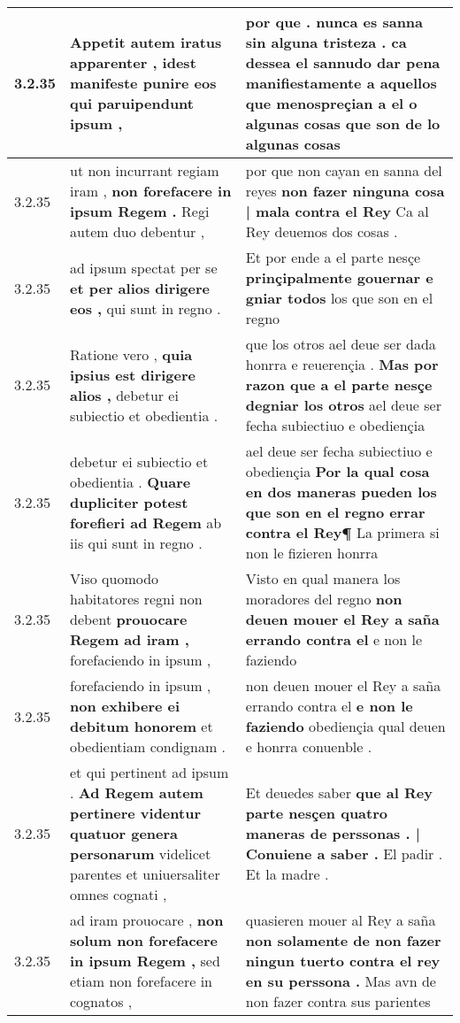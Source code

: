 \begin{tabular}{|p{1cm}|p{6.5cm}|p{6.5cm}|}
3.2.35 & Appetit autem iratus apparenter , \textbf{ idest manifeste punire eos } qui paruipendunt ipsum , & por que . nunca es sanna sin alguna tristeza . \textbf{ ca dessea el sannudo dar pena manifiestamente a aquellos que menospreçian a el o algunas cosas } que son de lo algunas cosas \\\hline
3.2.35 & ut non incurrant regiam iram , \textbf{ non forefacere in ipsum Regem . } Regi autem duo debentur , & por que non cayan en sanna del reyes \textbf{ non fazer ninguna cosa | mala contra el Rey } Ca al Rey deuemos dos cosas . \\\hline
3.2.35 & ad ipsum spectat per se \textbf{ et per alios dirigere eos , } qui sunt in regno . & Et por ende a el parte nesçe \textbf{ prinçipalmente gouernar e gniar todos } los que son en el regno \\\hline
3.2.35 & Ratione vero , \textbf{ quia ipsius est dirigere alios , } debetur ei subiectio et obedientia . & que los otros ael deue ser dada honrra e reuerençia . \textbf{ Mas por razon que a el parte nesçe degniar los otros } ael deue ser fecha subiectiuo e obediençia \\\hline
3.2.35 & debetur ei subiectio et obedientia . \textbf{ Quare dupliciter potest forefieri ad Regem } ab iis qui sunt in regno . & ael deue ser fecha subiectiuo e obediençia \textbf{ Por la qual cosa en dos maneras pueden los que son en el regno errar contra el Rey¶ } La primera si non le fizieren honrra \\\hline
3.2.35 & Viso quomodo habitatores regni non debent \textbf{ prouocare Regem ad iram , } forefaciendo in ipsum , & Visto en qual manera los moradores del regno \textbf{ non deuen mouer el Rey a saña errando contra el } e non le faziendo \\\hline
3.2.35 & forefaciendo in ipsum , \textbf{ non exhibere ei debitum honorem } et obedientiam condignam . & non deuen mouer el Rey a saña errando contra el \textbf{ e non le faziendo } obediençia qual deuen e honrra conuenble . \\\hline
3.2.35 & et qui pertinent ad ipsum . \textbf{ Ad Regem autem pertinere videntur quatuor genera personarum } videlicet parentes et uniuersaliter omnes cognati , & Et deuedes saber \textbf{ que al Rey parte nesçen quatro maneras de perssonas . | Conuiene a saber . } El padir . Et la madre . \\\hline
3.2.35 & ad iram prouocare , \textbf{ non solum non forefacere in ipsum Regem , } sed etiam non forefacere in cognatos , & quasieren mouer al Rey a saña \textbf{ non solamente de non fazer ningun tuerto contra el rey en su perssona . } Mas avn de non fazer contra sus parientes \\\hline

\end{tabular}
